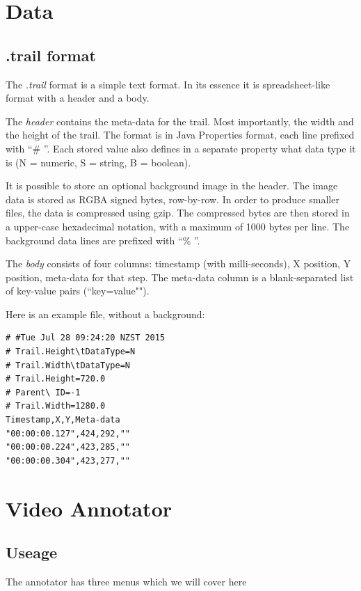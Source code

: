 \documentclass[a4paper]{book}
\begin{document}
\chapter{Data}
\section{.trail format}
The \textit{.trail} format is a simple text format. In its essence it is
spreadsheet-like format with a header and a body.

The \textit{header} contains the meta-data for the trail. Most importantly,
the width and the height of the trail. The format is in Java Properties format,
each line prefixed with ``\# ''. Each stored value also defines in a separate
property what data type it is (N = numeric, S = string, B = boolean).

It is possible to store an optional background image in the header. The image
data is stored as RGBA signed bytes, row-by-row. In order to produce smaller
files, the data is compressed using gzip\cite{gzip}. The compressed bytes are
then stored in a upper-case hexadecimal notation, with a maximum of 1000 bytes
per line. The background data lines are prefixed with ``\% ''.

The \textit{body} consists of four columns: timestamp (with milli-seconds), X position,
Y position, meta-data for that step. The meta-data column is a blank-separated list of
key-value pairs (``key=value"").

Here is an example file, without a background:

\begin{verbatim}
# #Tue Jul 28 09:24:20 NZST 2015
# Trail.Height\tDataType=N
# Trail.Width\tDataType=N
# Trail.Height=720.0
# Parent\ ID=-1
# Trail.Width=1280.0
Timestamp,X,Y,Meta-data
"00:00:00.127",424,292,""
"00:00:00.224",423,285,""
"00:00:00.304",423,277,""
\end{verbatim}


\chapter{Video Annotator}
\section{Useage}
The annotator has three menus which we will cover here


\end{document}
